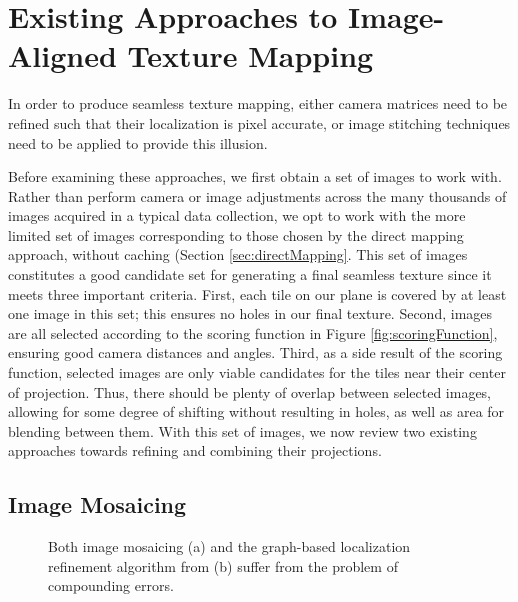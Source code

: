 \documentclass[10pt,twocolumn,letterpaper]{article}
\begin{document}
\section{Existing Approaches to Image-Aligned Texture Mapping}
\label{sec:existingApproaches}
In order to produce seamless texture mapping, either camera matrices
need to be refined such that their localization is pixel accurate, or
image stitching techniques need to be applied to provide this
illusion.

Before examining these approaches, we first obtain a set of images to
work with.  Rather than perform camera or image adjustments across the
many thousands of images acquired in a typical data collection, we opt
to work with the more limited set of images corresponding to those
chosen by the direct mapping approach, without caching (Section
\ref{sec:directMapping}. This set of images constitutes a good
candidate set for generating a final seamless texture since it meets
three important criteria. First, each tile on our plane is covered by
at least one image in this set; this ensures no holes in our final
texture. Second, images are all selected according to the scoring
function in Figure \ref{fig:scoringFunction}, ensuring good camera
distances and angles. Third, as a side result of the scoring function,
selected images are only viable candidates for the tiles near their
center of projection. Thus, there should be plenty of overlap between
selected images, allowing for some degree of shifting without
resulting in holes, as well as area for blending between them. With
this set of images, we now review two existing approaches towards
refining and combining their projections.

\subsection{Image Mosaicing}
\label{sec:imageMosaicing}

\begin{figure}
  \centering

  \centering
  \caption{Both image mosaicing (a) and the graph-based localization refinement algorithm from
    \cite{chen2010indoor} (b) suffer from the problem of compounding
    errors.}
  \label{fig:mosaic3D}
\end{figure}
\end{document}
